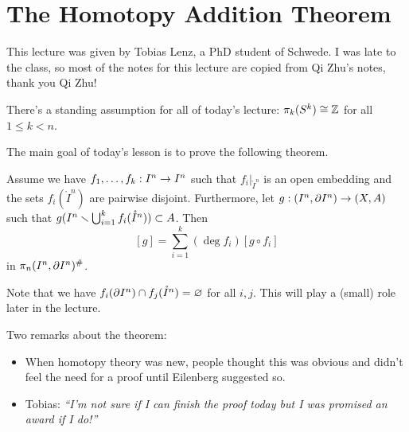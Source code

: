 
\section{The Homotopy Addition Theorem}


This lecture was given by Tobias Lenz, a PhD student of Schwede. I was late to the class, so most of the notes for this lecture are copied from Qi Zhu's notes, thank you Qi Zhu!

\begin{remark}
There's a standing assumption for all of today's lecture: $\pi_k(S^k)\cong{\mathbb Z}$ for all $1\leq k<n$.
\end{remark}

The main goal of today's lesson is to prove the following theorem.

\begin{theorem}
Assume we have ${{f}_1,\dots,{f}_{k}}:I^n\to I^n$ such that $f_i|_{\ring I^n}$ is an open embedding and the sets $f_i(\ring I^n)$ are pairwise disjoint. Furthermore, let $g:(I^n,\partial I^n)\to (X,A)$ such that $g(I^n\smallsetminus\bigcup_{i=1}^k f_i(\mathring I^n))\subset A$. Then
\[[g]=\sum_{i=1}^k(\deg f_i)[g\circ f_i]\]
in $\pi_n(I^n,\partial I^n)^\#$.
\end{theorem}

\begin{remark}
Note that we have $f_i(\partial I^n)\cap f_j(\mathring I^n)=\varnothing$ for all $i,j$. This will play a (small) role later in the lecture.
\end{remark}

\begin{remark}
Two remarks about the theorem:
\begin{itemize}
    \item When homotopy theory was new, people thought this was obvious and didn't feel the need for a proof until Eilenberg suggested so.
    \item Tobias: \emph{\enquote{I'm not sure if I can finish the proof today but I was promised an award if I do!}}
\end{itemize}
\end{remark}

